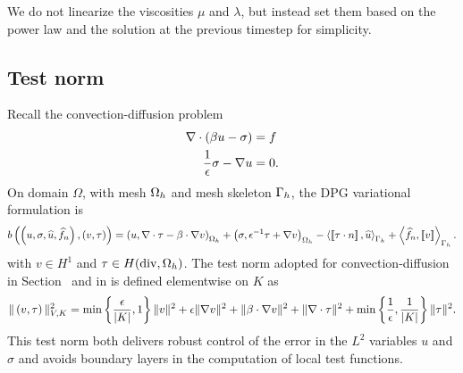 We do not linearize the viscosities $\mu$ and $\lambda$, but instead set them based on the power law and the solution at the previous timestep for simplicity. 

\subsection{Test norm}

Recall the convection-diffusion problem 
\begin{align*}
\div \left(\beta u - \sigma\right) &= f\\
\frac{1}{\epsilon}\sigma - \grad u &= 0.
\end{align*}
On domain $\Omega$, with mesh $\Oh$ and mesh skeleton $\Gh$, the DPG variational formulation is
\begin{align*}
b\left(\left(u,\sigma, \widehat{u}, \widehat{f}_n\right),
\left( v, \tau \right)\right) = \left(u,\div \tau - \beta \cdot \grad
v\right)_{\Oh} + \left(\sigma, \epsilon^{-1} \tau + \grad v\right)_{\Oh} - \LRa{
\jump{\tau\cdot n}, \widehat{u} }_{\Gh} + \LRa{ \widehat{f}_n,
  \jump{v} }_{\Gh}.
\end{align*}
with $v\in H^1$ and $\tau \in H({\rm div},\Oh)$. The test norm adopted for convection-diffusion in Section~ and in \cite{DPGrobustness2} is defined elementwise on $K$ as
\[
\|\left(v,\tau\right)\|_{V,K}^2 = \min\left\{\frac{\epsilon}{|K|},1\right\}\|v\|^2 + \epsilon \|\grad v\|^2 + \|\beta \cdot \grad v\|^2 + \| \div \tau\|^2 + \min\left\{\frac{1}{\epsilon},\frac{1}{|K|}\right\}\|\tau\|^2.
\]
This test norm both delivers robust control of the error in the $L^2$ variables $u$ and $\sigma$ and avoids boundary layers in the computation of local test functions. 

